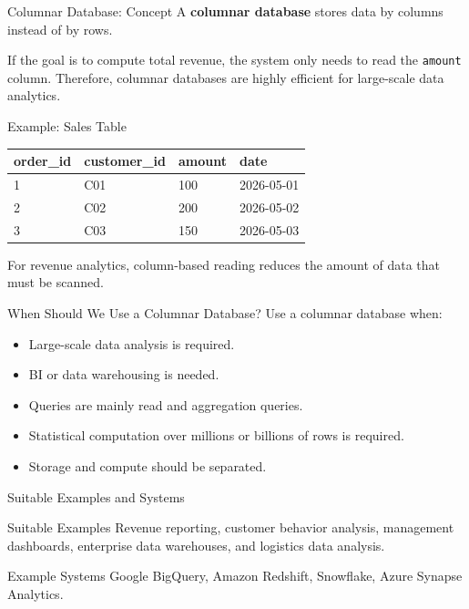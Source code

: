 \documentclass[aspectratio=169,11pt]{beamer}
\newcommand{\keyword}[1]{\textcolor{accent}{\textbf{#1}}}
\newcommand{\kw}[1]{\keyword{#1}}
\newcommand{\smallitem}{\setlength{\itemsep}{2pt}\setlength{\parskip}{0pt}}
\begin{document}
\begin{frame}{Columnar Database: Concept}
A \kw{columnar database} stores data by columns instead of by rows.

\vspace{2mm}
If the goal is to compute total revenue, the system only needs to read the \texttt{amount} column. Therefore, columnar databases are highly efficient for large-scale data analytics.
\end{frame}

\begin{frame}{Example: Sales Table}
\scriptsize
\begin{center}
\begin{tabular}{llll}
\toprule
\textbf{order\_id} & \textbf{customer\_id} & \textbf{amount} & \textbf{date} \\
\midrule
1 & C01 & 100 & 2026-05-01 \\
2 & C02 & 200 & 2026-05-02 \\
3 & C03 & 150 & 2026-05-03 \\
\bottomrule
\end{tabular}
\end{center}

\vspace{2mm}
For revenue analytics, column-based reading reduces the amount of data that must be scanned.
\end{frame}

\begin{frame}{When Should We Use a Columnar Database?}
Use a columnar database when:
\begin{itemize}
  \smallitem
  \item Large-scale data analysis is required.
  \item BI or data warehousing is needed.
  \item Queries are mainly read and aggregation queries.
  \item Statistical computation over millions or billions of rows is required.
  \item Storage and compute should be separated.
\end{itemize}
\end{frame}

\begin{frame}{Suitable Examples and Systems}
\begin{block}{Suitable Examples}
Revenue reporting, customer behavior analysis, management dashboards, enterprise data warehouses, and logistics data analysis.
\end{block}

\begin{block}{Example Systems}
Google BigQuery, Amazon Redshift, Snowflake, Azure Synapse Analytics.
\end{block}
\end{frame}
\end{document}
